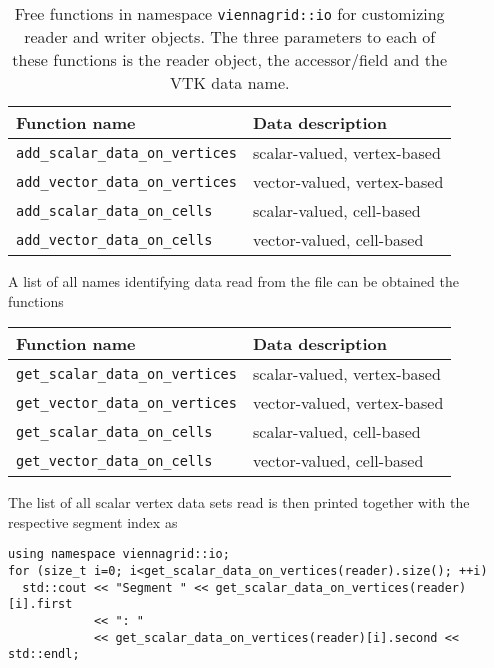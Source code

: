  

 \begin{table}[tb]
 \begin{center}
  \begin{tabular}{|l|l|}
   \hline
   Function name & Data description \\
   \hline
   \lstinline|add_scalar_data_on_vertices| & scalar-valued, vertex-based \\
   \lstinline|add_vector_data_on_vertices| & vector-valued, vertex-based \\
   \hline
   \lstinline|add_scalar_data_on_cells| & scalar-valued, cell-based \\
   \lstinline|add_vector_data_on_cells| & vector-valued, cell-based \\
   \hline
  \end{tabular}
 \end{center}
 \caption{Free functions in namespace \lstinline|viennagrid::io| for customizing reader and writer objects. The three parameters to each of these functions is the reader object, the accessor/field and the VTK data name.}
 \label{tab:customizing-io}
 \end{table}
 
 A list of all names identifying data read from the file can be obtained the functions
 \begin{center}
  \begin{tabular}{|l|l|}
   \hline
   Function name & Data description \\
   \hline
   \lstinline|get_scalar_data_on_vertices| & scalar-valued, vertex-based \\
   \lstinline|get_vector_data_on_vertices| & vector-valued, vertex-based \\
   \hline
   \lstinline|get_scalar_data_on_cells| & scalar-valued, cell-based \\
   \lstinline|get_vector_data_on_cells| & vector-valued, cell-based \\
   \hline
  \end{tabular}
 \end{center}

 The list of all scalar vertex data sets read is then printed together with the respective segment index as
 \begin{lstlisting}
using namespace viennagrid::io;
for (size_t i=0; i<get_scalar_data_on_vertices(reader).size(); ++i)
  std::cout << "Segment " << get_scalar_data_on_vertices(reader)[i].first 
            << ": "
            << get_scalar_data_on_vertices(reader)[i].second << std::endl;
 \end{lstlisting}
 
